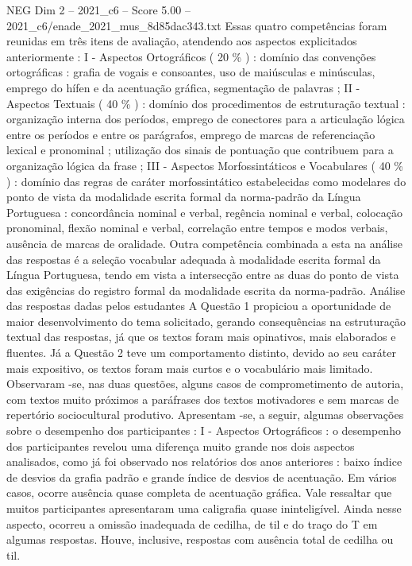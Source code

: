 \begin{textsample}{NEG Dim 2 – 2021\_c6 – Score 5.00 – 2021\_c6/enade\_2021\_mus\_8d85dac343.txt}
Essas quatro competências foram reunidas em três itens de avaliação, atendendo aos aspectos explicitados anteriormente : I - Aspectos Ortográficos ( 20 \% ) : domínio das convenções ortográficas : grafia de vogais e consoantes, uso de maiúsculas e minúsculas, emprego do hífen e da acentuação gráfica, segmentação de palavras ; II - Aspectos Textuais ( 40 \% ) : domínio dos procedimentos de estruturação textual : organização interna dos períodos, emprego de conectores para a articulação lógica entre os períodos e entre os parágrafos, emprego de marcas de referenciação lexical e pronominal ; utilização dos sinais de pontuação que contribuem para a organização lógica da frase ; III - Aspectos Morfossintáticos e Vocabulares ( 40 \% ) : domínio das regras de caráter morfossintático estabelecidas como modelares do ponto de vista da modalidade escrita formal da norma-padrão da Língua Portuguesa : concordância nominal e verbal, regência nominal e verbal, colocação pronominal, flexão nominal e verbal, correlação entre tempos e modos verbais, ausência de marcas de oralidade.
Outra competência combinada a esta na análise das respostas é a seleção vocabular adequada à modalidade escrita formal da Língua Portuguesa, tendo em vista a intersecção entre as duas do ponto de vista das exigências do registro formal da modalidade escrita da norma-padrão.
Análise das respostas dadas pelos estudantes A Questão 1 propiciou a oportunidade de maior desenvolvimento do tema solicitado, gerando consequências na estruturação textual das respostas, já que os textos foram mais opinativos, mais elaborados e fluentes.
Já a Questão 2 teve um comportamento distinto, devido ao seu caráter mais expositivo, os textos foram mais curtos e o vocabulário mais limitado.
Observaram -se, nas duas questões, alguns casos de comprometimento de autoria, com textos muito próximos a paráfrases dos textos motivadores e sem marcas de repertório sociocultural produtivo.
Apresentam -se, a seguir, algumas observações sobre o desempenho dos participantes : I - Aspectos Ortográficos : o desempenho dos participantes revelou uma diferença muito grande nos dois aspectos analisados, como já foi observado nos relatórios dos anos anteriores : baixo índice de desvios da grafia padrão e grande índice de desvios de acentuação.
Em vários casos, ocorre ausência quase completa de acentuação gráfica.
Vale ressaltar que muitos participantes apresentaram uma caligrafia quase ininteligível.
Ainda nesse aspecto, ocorreu a omissão inadequada de cedilha, de til e do traço do T em algumas respostas.
Houve, inclusive, respostas com ausência total de cedilha ou til.

\end{textsample}
